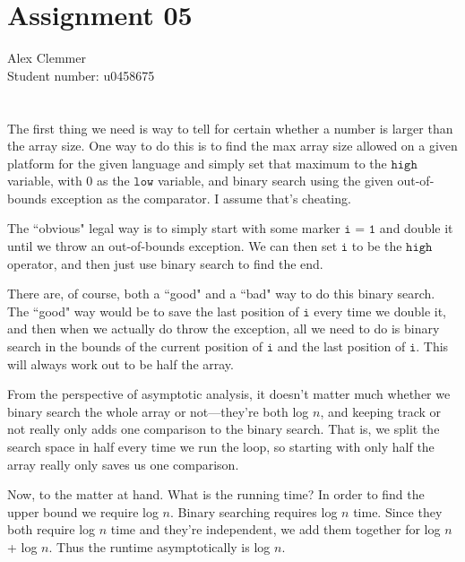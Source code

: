 \documentclass[a4paper]{article}
\begin{document}
\section*{Assignment 05}
Alex Clemmer\\
Student number: u0458675

\section*{}

The first thing we need is way to tell for certain whether a number is larger than the array size. One way to do this is to find the max array size allowed on a given platform for the given language and simply set that maximum to the $\texttt{high}$ variable, with 0 as the $\texttt{low}$ variable, and binary search using the given out-of-bounds exception as the comparator. I assume that's cheating.

The ``obvious" legal way is to simply start with some marker $\texttt{i = 1}$ and double it until we throw an out-of-bounds exception. We can then set $\texttt{i}$ to be the $\texttt{high}$ operator, and then just use binary search to find the end.

There are, of course, both a ``good" and a ``bad" way to do this binary search. The ``good" way would be to save the last position of $\texttt{i}$ every time we double it, and then when we actually do throw the exception, all we need to do is binary search in the bounds of the current position of $\texttt{i}$ and the last position of $\texttt{i}$. This will always work out to be half the array.

From the perspective of asymptotic analysis, it doesn't matter much whether we binary search the whole array or not---they're both log $n$, and keeping track or not really only adds one comparison to the binary search. That is, we split the search space in half every time we run the loop, so starting with only half the array really only saves us one comparison.

Now, to the matter at hand. What is the running time? In order to find the upper bound we require log $n$. Binary searching requires log $n$ time. Since they both require log $n$ time and they're independent, we add them together for log $n$ + log $n$. Thus the runtime asymptotically is log $n$.
\end{document}
